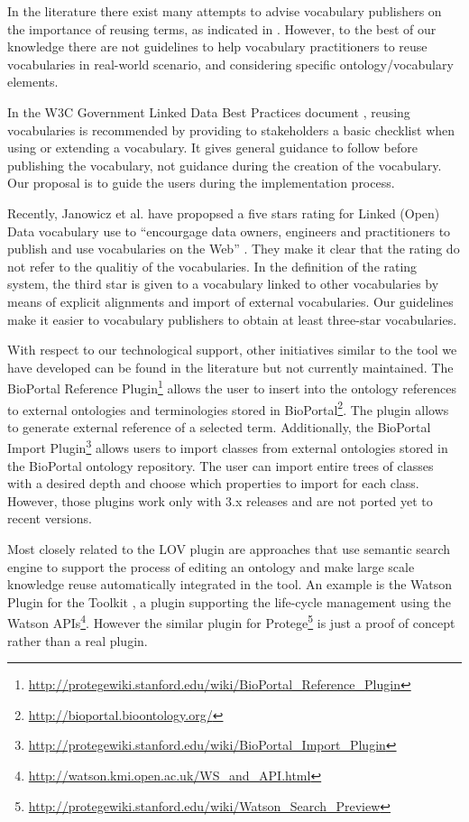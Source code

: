 In the literature there exist many attempts to advise vocabulary publishers on the importance of reusing terms, as indicated in \cite{janowicz2014five,jimenez2008}. However, to the best of our knowledge there are not guidelines to help vocabulary practitioners to reuse vocabularies in real-world scenario, and considering specific ontology/vocabulary elements. 

In the W3C Government Linked Data Best Practices document \cite{hyland14}, reusing vocabularies is recommended by providing to stakeholders a basic checklist when using or extending a vocabulary. It gives general guidance to follow before publishing the vocabulary, not guidance during the creation of the vocabulary. Our proposal is to guide the users during the implementation process.

Recently, Janowicz et al. have propopsed a five stars rating for Linked (Open) Data vocabulary use to ``encourgage data owners, engineers and practitioners to publish and use vocabularies on the Web'' \cite{janowicz2014five}. They make it clear that the rating do not refer to the qualitiy of the vocabularies. In the definition of the rating system, the third star is given to a vocabulary linked to other vocabularies by means of explicit alignments and import of external vocabularies. Our guidelines make it easier to vocabulary publishers to obtain at least three-star vocabularies.

With respect to our technological support, other initiatives similar to the tool we have developed can be found in the literature but not currently maintained. The BioPortal Reference Plugin\footnote{\url{http://protegewiki.stanford.edu/wiki/BioPortal_Reference_Plugin}} allows the user to insert into the ontology references to external ontologies and terminologies stored in BioPortal\footnote{\url{http://bioportal.bioontology.org/}}. The plugin allows to generate external reference of a selected term. Additionally, the BioPortal Import Plugin\footnote{\url{http://protegewiki.stanford.edu/wiki/BioPortal_Import_Plugin}} allows users to import classes from external ontologies stored in the BioPortal ontology repository. The user can import entire trees of classes with a desired depth and choose which properties to import for each class. However, those plugins work only with \protege 3.x releases and are not ported yet to recent versions. 

Most closely related to the {\protege}LOV plugin are approaches that use semantic search engine to support the process of editing an ontology and make large scale knowledge reuse automatically integrated in the tool. An example is the Watson Plugin \cite{neonguide2008} for the \neon Toolkit \cite{haase2008neon}, a plugin supporting the \neon life-cycle management using the Watson \cite{d2007watson} APIs\footnote{\url{http://watson.kmi.open.ac.uk/WS_and_API.html}}. However the similar plugin for Protege\footnote{\url{http://protegewiki.stanford.edu/wiki/Watson_Search_Preview}} is just a proof of concept rather than a real plugin.

 
